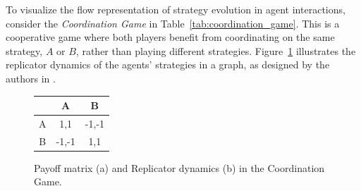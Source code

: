         \noindent
        To visualize the flow representation of strategy evolution in agent interactions, consider the \emph{Coordination Game} in Table~\ref{tab:coordination_game}. This is a cooperative game where both players benefit from coordinating on the same strategy, $A$ or $B$, rather than playing different strategies. Figure~\ref{fig:coordination_game} illustrates the replicator dynamics of the agents' strategies in a graph, as designed by the authors in \cite{omidshafiei2019alpharank}.
        \begin{figure}[H]
            \centering
            \begin{minipage}{0.45\textwidth}
                \centering
                \vspace{1.4cm}
                \begin{tabular}{c|c|c}
                    & A & B \\ \hline
                    A & 1,1 & -1,-1 \\
                    B & -1,-1 & 1,1 \\
                \end{tabular}
                \vspace{1.4cm}
                \label{tab:coordination_game}
            \end{minipage}
            \hspace{0.1em}
            \begin{minipage}{0.45\textwidth}
                \centering
                \label{fig:coordination_game_dynamics}
            \end{minipage}
            \caption{Payoff matrix (a) and Replicator dynamics (b) in the Coordination Game.}
            \label{fig:coordination_game}
        \end{figure}

